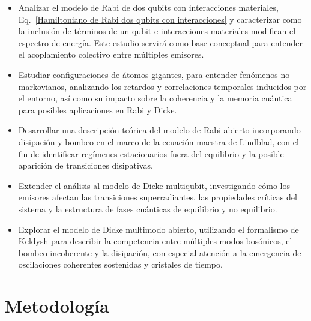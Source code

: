 \documentclass[onecolumn,notitlepage,letterpaper,aps,pra,12pt]{article}
\numberwithin{equation}{section}
\begin{document}
\begin{itemize}
    \item Analizar el modelo de Rabi de dos qubits con interacciones materiales, Eq.~\eqref{Hamiltoniano de Rabi dos qubits con interacciones} y caracterizar como la inclusión de términos de un qubit e interacciones materiales modifican el espectro de energía. Este estudio servirá como base conceptual para entender el acoplamiento colectivo entre múltiples emisores.
    
    \item Estudiar configuraciones de átomos gigantes, para entender fenómenos no markovianos, analizando los retardos y correlaciones temporales inducidos por el entorno, así como su impacto sobre la coherencia y la memoria cuántica para posibles aplicaciones en Rabi y Dicke.
    

    \item Desarrollar una descripción teórica del modelo de Rabi abierto incorporando disipación y bombeo en el marco de la ecuación maestra de Lindblad, con el fin de identificar regímenes estacionarios fuera del equilibrio y la posible aparición de transiciones disipativas.

    \item Extender el análisis al modelo de Dicke multiqubit, investigando cómo los emisores afectan las transiciones superradiantes, las propiedades críticas del sistema y la estructura de fases cuánticas de equilibrio y no equilibrio.

    \item Explorar el modelo de Dicke multimodo abierto, utilizando el formalismo de Keldysh para describir la competencia entre múltiples modos bosónicos, el bombeo incoherente y la disipación, con especial atención a la emergencia de oscilaciones coherentes sostenidas y cristales de tiempo.

    


\end{itemize}



\section{Metodología}
\end{document}
